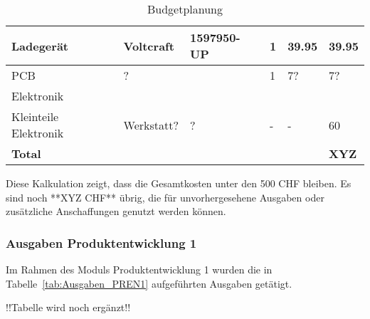 \documentclass[main.tex]{subfiles} %
\begin{document}
\begin{table}[h]
\begin{tabular}{|p{3cm}|p{3cm}|p{3cm}|p{1cm}|p{1.5cm}|p{1cm}|}
        Ladegerät                              & Voltcraft           & 1597950-UP              & 1               & 39.95                     & 39.95                       \\ \hline
        PCB                                    & ?                   &                         & 1               & 7?                        & 7?                          \\ \hline
        \rowcolor{lightgray} Elektronik        &                     &                         &                 &                           &                             \\ \hline
        Kleinteile Elektronik                  & Werkstatt?          & ?                       & -               & -                         & 60                          \\ \hline
        \textbf{Total}                         &                     &                         &                 &                           & \textbf{XYZ}                \\ \hline
    \end{tabular}
    \caption{Budgetplanung}
    \label{tab:Budgetplanung}
\end{table}

Diese Kalkulation zeigt, dass die Gesamtkosten unter den 500 CHF bleiben. Es
sind noch **XYZ CHF** übrig, die für unvorhergesehene Ausgaben oder zusätzliche
Anschaffungen genutzt werden können.

\subsubsection{Ausgaben Produktentwicklung 1}
Im Rahmen des Moduls Produktentwicklung 1 wurden die in
Tabelle~\ref{tab:Ausgaben_PREN1} aufgeführten Ausgaben getätigt.

!!Tabelle wird noch ergänzt!!
\end{document}
